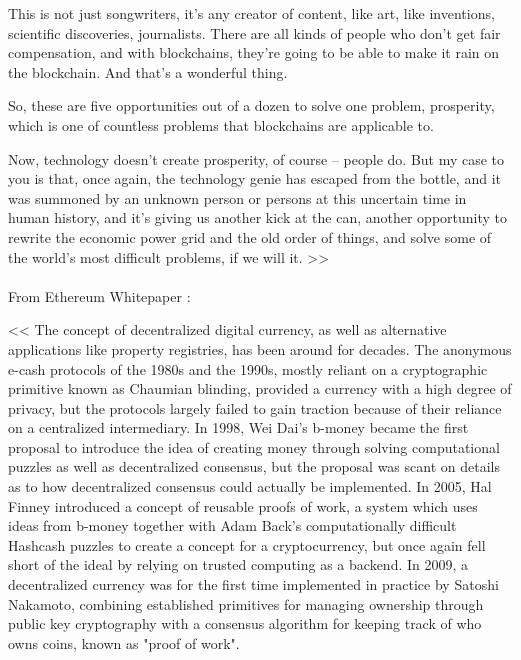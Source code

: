 \documentclass[a4paper]{article}
\begin{document}
This is not just songwriters, it's any creator of content, like art, like inventions, scientific discoveries, journalists. There are all kinds of people who don't get fair compensation, and with blockchains, they're going to be able to make it rain on the blockchain. And that's a wonderful thing.

So, these are five opportunities out of a dozen to solve one problem, prosperity, which is one of countless problems that blockchains are applicable to.


Now, technology doesn't create prosperity, of course -- people do. But my case to you is that, once again, the technology genie has escaped from the bottle, and it was summoned by an unknown person or persons at this uncertain time in human history, and it's giving us another kick at the can, another opportunity to rewrite the economic power grid and the old order of things, and solve some of the world's most difficult problems, if we will it.
>>
\\\\
From Ethereum Whitepaper : 

<<
The concept of decentralized digital currency, as well as alternative applications like property registries, has been around for decades. The anonymous e-cash protocols of the 1980s and the 1990s, mostly reliant on a cryptographic primitive known as Chaumian blinding, provided a currency with a high degree of privacy, but the protocols largely failed to gain traction because of their reliance on a centralized intermediary. In 1998, Wei Dai's b-money became the first proposal to introduce the idea of creating money through solving computational puzzles as well as decentralized consensus, but the proposal was scant on details as to how decentralized consensus could actually be implemented. In 2005, Hal Finney introduced a concept of reusable proofs of work, a system which uses ideas from b-money together with Adam Back's computationally difficult Hashcash puzzles to create a concept for a cryptocurrency, but once again fell short of the ideal by relying on trusted computing as a backend. In 2009, a decentralized currency was for the first time implemented in practice by Satoshi Nakamoto, combining established primitives for managing ownership through public key cryptography with a consensus algorithm for keeping track of who owns coins, known as "proof of work".
\end{document}

